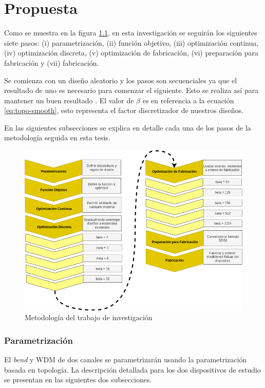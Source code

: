 \chapter{Propuesta}

Como se muestra en la figura \ref{fig:pipeline}, en esta investigación se seguirán los siguientes siete pasos:
(i) parametrización, 
(ii) función objetivo, 
(iii) optimización continua,
(iv) optimización discreta,
(v) optimización de fabricación,
(vi) preparación para fabricación y
(vii) fabricación.

Se comienza con un diseño aleatorio y los pasos son secuenciales ya que el resultado de uno es necesario para comenzar el siguiente. 
Esto se realiza así para mantener un buen resultado \citep{Yang2017}.
El valor de $\beta$ es en referencia a la ecuación \ref{eq:topo-smooth}, esto representa el factor discretizador de nuestros diseños.

En las siguientes subsecciones se explica en detalle cada una de los pasos de la metodología seguida en esta tesis.

\begin{figure}[ht]
  \centering
  \includegraphics[width=\textwidth]{image/proposal/pipeline.png}
  \caption{Metodología del trabajo de investigación}
  \label{fig:pipeline}
\end{figure}

\subsection{Parametrización}

El \emph{bend} y WDM de dos canales se parametrizarán usando la parametrización basada en topología.
La descripción detallada para los dos dispositivos de estudio se presentan en las siguientes dos subsecciones.

